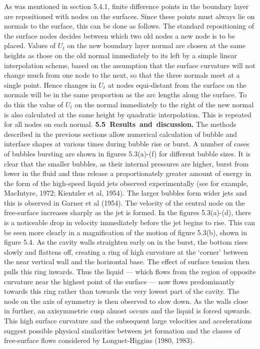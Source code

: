 As was mentioned in section 5.4.1, finite difference points in the boundary layer
are repositioned with nodes on the surfaces. Since these points must always
lie on normals to the surface, this can be done as follows. The standard
repositioning of the surface nodes decides between which two 
old nodes a new node
is to be placed. Values of $U_t$ on the new boundary layer normal are chosen
at the same heights as those on the old normal immediately to its left
by a simple linear interpolation scheme, based on the assumption that
the surface curvature will not change much from one node to the next, 
so that the 
three normals meet at a single point. 
Hence changes in $U_t$ at nodes equi-distant from the surface on
the normals will be in the same proportion as the 
arc lengths along the surface. To do this the value of $U_t$ on the 
normal immediately to the right of the new normal is also calculated
at the same height by quadratic interpolation. This is repeated for all 
nodes on each normal.
\vskip 15pt
\hbox{\bf 5.5 Results and discussion.}
\vskip 5pt
The methods described in the previous sections allow numerical calculation of
bubble and interface shapes at various times during bubble rise or burst.
A number of cases of bubbles bursting 
are shown in figures 5.3(a)-(f) for different bubble sizes.
It is clear that the smaller bubbles, as their internal pressures are higher,
burst from lower in the fluid and thus release a proportionately 
greater amount of energy in the 
form of the high-speed liquid jets observed
experimentally (see for example, MacIntyre, 1972; Kientzler et al, 1954).
The larger bubbles form wider jets and this is observed in Garner et al (1954).
The velocity of the
central node on the free-surface increases sharply as the jet is formed.
In the figures 5.3(a)-(d), there is a noticeable drop in velocity 
immediately before the jet begins to rise. This can be seen more clearly
in a magnification 
of the motion of figure 5.3(b), shown in figure 5.4. As the cavity walls straighten
early on in the burst, the bottom rises slowly and flattens off,
creating a ring of high curvature at the `corner' between the 
near vertical wall and the horizontal base. The effect of surface tension then pulls
this ring inwards. Thus the liquid --- which flows from the region of opposite
curvature near the highest point of the surface --- now flows predominantly
towards this ring rather than towards the very lowest part of the cavity. The 
node on the axis of symmetry is then observed to slow down. 
As the walls close in further,
an axisymmetric cusp almost occurs and the liquid is forced upwards. 
This high surface curvature and the subsequent large velocities and
accelerations suggest possible physical similarities between jet
formation and the
classes of free-surface flows considered by Longuet-Higgins (1980, 1983).

